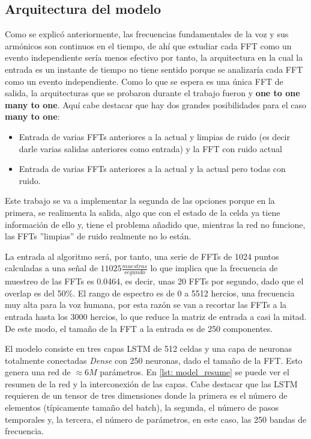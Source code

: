\subsection{Arquitectura del modelo}
Como se explicó anteriormente, las frecuencias fundamentales de la voz y sus armónicos son continuos en el tiempo, de ahí que estudiar cada \gls{FFT} como un evento independiente sería menos efectivo por tanto, la arquitectura en la cual la entrada es un instante de tiempo no tiene sentido porque se analizaría cada \gls{FFT} como un evento independiente. Como lo que se espera es una única \gls{FFT} de salida, la arquitecturas que se probaron durante el trabajo fueron y \textbf{one to one} \textbf{many to one}. Aquí cabe destacar que hay dos grandes posibilidades para el caso \textbf{many to one}:
\begin{itemize}
	\item Entrada de varias \glspl{FFT} anteriores a la actual y limpias de ruido (es decir darle varias salidas anteriores como entrada) y la \gls{FFT} con ruido actual
	\item Entrada de varias \glspl{FFT} anteriores a la actual y la actual pero todas con ruido.
\end{itemize}
Este trabajo se va a implementar la segunda de las opciones porque en la primera, se realimenta la salida, algo que con el estado de la celda ya tiene información de ello y, tiene el problema añadido que, mientras la red no funcione, las \glspl{FFT} ''limpias'' de ruido realmente no lo están.

La entrada al algoritmo será, por tanto, una serie de \glspl{FFT} de 1024 puntos calculadas a una señal de $11025\frac{muestras}{segundo}$ lo que implica que la frecuencia de muestreo de las \glspl{FFT} es 0.0464, es decir, unas 20 \glspl{FFT} por segundo, dado que el overlap es del 50\%. El rango de espectro es de 0 a 5512 hercios, una frecuencia muy alta para la voz humana, por esta razón se van a recortar las \glspl{FFT} a la entrada hasta los 3000 hercios, lo que reduce la matriz de entrada a casi la mitad. De este modo, el tamaño de la \gls{FFT} a la entrada es de 250 componentes.

El modelo consiste en tres capas \gls{LSTM} de 512 celdas y una capa de neuronas totalmente conectadas \textit{Dense} con 250 neuronas, dado el tamaño de la \gls{FFT}. Esto genera una red de $\approx6M$ parámetros. En \ref{lst: model_resume} se puede ver el resumen de la red y la interconexión de las capas. Cabe destacar que las \gls{LSTM} requieren de un tensor de tres dimensiones donde la primera es el número de elementos (típicamente tamaño del batch), la segunda, el número de pasos temporales y, la tercera, el número de parámetros, en este caso, las 250 bandas de frecuencia.

